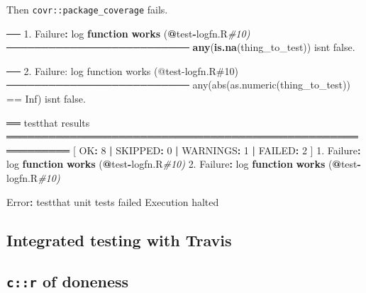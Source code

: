 \documentclass[
]{article}
\newenvironment{Shaded}{\begin{snugshade}}{\end{snugshade}}
\newcommand{\CommentTok}[1]{\textcolor[rgb]{0.56,0.35,0.01}{\textit{#1}}}
\newcommand{\ControlFlowTok}[1]{\textcolor[rgb]{0.13,0.29,0.53}{\textbf{#1}}}
\newcommand{\DecValTok}[1]{\textcolor[rgb]{0.00,0.00,0.81}{#1}}
\newcommand{\FloatTok}[1]{\textcolor[rgb]{0.00,0.00,0.81}{#1}}
\newcommand{\KeywordTok}[1]{\textcolor[rgb]{0.13,0.29,0.53}{\textbf{#1}}}
\newcommand{\NormalTok}[1]{#1}
\newcommand{\OperatorTok}[1]{\textcolor[rgb]{0.81,0.36,0.00}{\textbf{#1}}}
\newcommand{\StringTok}[1]{\textcolor[rgb]{0.31,0.60,0.02}{#1}}
\begin{document}
Then \texttt{covr::package\_coverage} fails.

\begin{Shaded}
\begin{Highlighting}[]
\NormalTok{── }\FloatTok{1.}\NormalTok{ Failure}\OperatorTok{:}\StringTok{ }\NormalTok{log }\ControlFlowTok{function} \KeywordTok{works}\NormalTok{ (}\OperatorTok{@}\NormalTok{test}\OperatorTok{{-}}\NormalTok{logfn.R}\CommentTok{\#10)  ──────────────────────────}
\KeywordTok{any}\NormalTok{(}\KeywordTok{is.na}\NormalTok{(thing\_to\_test)) isn}\StringTok{\textquotesingle{}t false.}

\StringTok{── 2. Failure: log function works (@test{-}logfn.R\#10)  ──────────────────────────}
\StringTok{any(abs(as.numeric(thing\_to\_test)) == Inf) isn\textquotesingle{}}\NormalTok{t false.}

\NormalTok{══ testthat results  ═══════════════════════════════════════════════════════════}
\NormalTok{[ OK}\OperatorTok{:}\StringTok{ }\DecValTok{8} \OperatorTok{|}\StringTok{ }\NormalTok{SKIPPED}\OperatorTok{:}\StringTok{ }\DecValTok{0} \OperatorTok{|}\StringTok{ }\NormalTok{WARNINGS}\OperatorTok{:}\StringTok{ }\DecValTok{1} \OperatorTok{|}\StringTok{ }\NormalTok{FAILED}\OperatorTok{:}\StringTok{ }\DecValTok{2}\NormalTok{ ]}
\FloatTok{1.}\NormalTok{ Failure}\OperatorTok{:}\StringTok{ }\NormalTok{log }\ControlFlowTok{function} \KeywordTok{works}\NormalTok{ (}\OperatorTok{@}\NormalTok{test}\OperatorTok{{-}}\NormalTok{logfn.R}\CommentTok{\#10) }
\FloatTok{2.}\NormalTok{ Failure}\OperatorTok{:}\StringTok{ }\NormalTok{log }\ControlFlowTok{function} \KeywordTok{works}\NormalTok{ (}\OperatorTok{@}\NormalTok{test}\OperatorTok{{-}}\NormalTok{logfn.R}\CommentTok{\#10) }

\NormalTok{Error}\OperatorTok{:}\StringTok{ }\NormalTok{testthat unit tests failed}
\NormalTok{Execution halted}
\end{Highlighting}
\end{Shaded}

\hypertarget{integrated-testing-with-travis}{%
\subsection{Integrated testing with Travis}\label{integrated-testing-with-travis}}

\hypertarget{cr-of-doneness}{%
\subsection{\texorpdfstring{\texttt{c::r} of doneness}{c::r of doneness}}\label{cr-of-doneness}}
\end{document}
